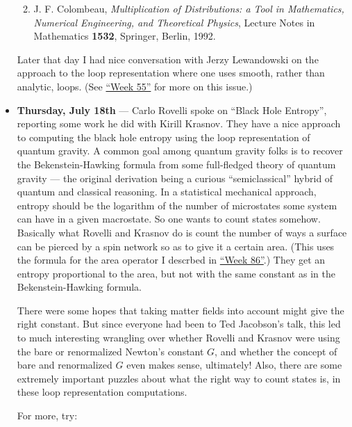 \documentclass{article}
\def\tightlist{}
\renewcommand{\texttt}[1]{%
  \begingroup
  \ttfamily
  \begingroup\lccode`~=`/\lowercase{\endgroup\def~}{/\discretionary{}{}{}}%
  \begingroup\lccode`~=`[\lowercase{\endgroup\def~}{[\discretionary{}{}{}}%
  \begingroup\lccode`~=`.\lowercase{\endgroup\def~}{.\discretionary{}{}{}}%
  \catcode`/=\active\catcode`[=\active\catcode`.=\active
  \scantokens{#1\noexpand}%
  \endgroup
}
\begin{document}
\begin{itemize}
  \begin{enumerate}
  \def\labelenumi{\arabic{enumi})}
  \setcounter{enumi}{1}
  \tightlist
  \item
    J. F. Colombeau, \emph{Multiplication of Distributions: a Tool in
    Mathematics, Numerical Engineering, and Theoretical Physics},
    Lecture Notes in Mathematics \textbf{1532}, Springer, Berlin, 1992.
  \end{enumerate}

  Later that day I had nice conversation with Jerzy Lewandowski on the
  approach to the loop representation where one uses smooth, rather than
  analytic, loops. (See \protect\hyperlink{week55}{``Week 55''} for more
  on this issue.)
\item
  \textbf{Thursday, July 18th} --- Carlo Rovelli spoke on ``Black Hole
  Entropy'', reporting some work he did with Kirill Krasnov. They have a
  nice approach to computing the black hole entropy using the loop
  representation of quantum gravity. A common goal among quantum gravity
  folks is to recover the Bekenstein-Hawking formula from some
  full-fledged theory of quantum gravity --- the original derivation
  being a curious ``semiclassical'' hybrid of quantum and classical
  reasoning. In a statistical mechanical approach, entropy should be the
  logarithm of the number of microstates some system can have in a given
  macrostate. So one wants to count states somehow. Basically what
  Rovelli and Krasnov do is count the number of ways a surface can be
  pierced by a spin network so as to give it a certain area. (This uses
  the formula for the area operator I descrbed in
  \protect\hyperlink{week86}{``Week 86''}.) They get an entropy
  proportional to the area, but not with the same constant as in the
  Bekenstein-Hawking formula.

  There were some hopes that taking matter fields into account might
  give the right constant. But since everyone had been to Ted Jacobson's
  talk, this led to much interesting wrangling over whether Rovelli and
  Krasnov were using the bare or renormalized Newton's constant \(G\),
  and whether the concept of bare and renormalized \(G\) even makes
  sense, ultimately! Also, there are some extremely important puzzles
  about what the right way to count states is, in these loop
  representation computations.

  For more, try:

\end{itemize}
\end{document}
